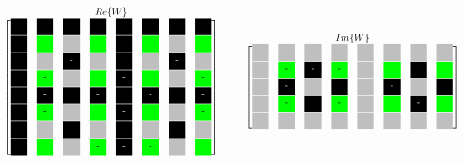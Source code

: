  \begin{minipage}{0.9\textwidth}
\begingroup
 \renewcommand*{\arraystretch}{0.95} %

\begin{center}
  \[
   \stackrel{\mbox{$Re\{W\}$}}{
    \begin{bmatrix}
     \myboxOnePos 	& \myboxOnePos 		& \myboxOnePos 	& \myboxOnePos 		& \myboxOnePos 	& \myboxOnePos 		& \myboxOnePos 	& \myboxOnePos \\
     \myboxOnePos 	& \myboxSqrtPos 	& \myboxZero 	& \myboxSqrtNeg		& \myboxOneNeg	& \myboxSqrtNeg		& \myboxZero	& \myboxSqrtPos \\
     \myboxOnePos 	& \myboxZero 		& \myboxOneNeg 	& \myboxZero 		& \myboxOnePos 	& \myboxZero 		& \myboxOneNeg 	& \myboxZero \\
     \myboxOnePos 	& \myboxSqrtNeg 	& \myboxZero 	& \myboxSqrtPos 	& \myboxOneNeg 	& \myboxSqrtPos 	& \myboxZero 	& \myboxSqrtNeg \\
     \myboxOnePos 	& \myboxOneNeg 		& \myboxOnePos 	& \myboxOneNeg 		& \myboxOnePos 	& \myboxOneNeg 		& \myboxOnePos 	& \myboxOneNeg \\
     \myboxOnePos 	& \myboxSqrtNeg 	& \myboxZero 	& \myboxSqrtPos 	& \myboxOneNeg 	& \myboxSqrtPos 	& \myboxZero 	& \myboxSqrtNeg \\
     \myboxOnePos 	& \myboxZero 		& \myboxOneNeg 	& \myboxZero 		& \myboxOnePos 	& \myboxZero 		& \myboxOneNeg 	& \myboxZero \\
     \myboxOnePos 	& \myboxSqrtPos 	& \myboxZero 	& \myboxSqrtNeg		& \myboxOneNeg	& \myboxSqrtNeg		& \myboxZero	& \myboxSqrtPos 
    \end{bmatrix}
   }
   \hspace{1cm}
   \stackrel{\mbox{$Im\{W\}$}}{
    \begin{bmatrix}
     \myboxZero 	& \myboxZero 		& \myboxZero 	& \myboxZero 		& \myboxZero 	& \myboxZero 		& \myboxZero 	& \myboxZero \\
     \myboxZero 	& \myboxSqrtNeg 	& \myboxOneNeg 	& \myboxSqrtNeg		& \myboxZero	& \myboxSqrtPos		& \myboxOnePos	& \myboxSqrtPos \\
     \myboxZero 	& \myboxOneNeg 		& \myboxZero 	& \myboxOnePos 		& \myboxZero 	& \myboxOneNeg 		& \myboxZero 	& \myboxOnePos \\
     \myboxZero 	& \myboxSqrtNeg 	& \myboxOnePos 	& \myboxSqrtNeg 	& \myboxZero 	& \myboxSqrtPos 	& \myboxOneNeg 	& \myboxSqrtPos \\
     \myboxZero 	& \myboxZero 		& \myboxZero 	& \myboxZero 		& \myboxZero 	& \myboxZero 		& \myboxZero 	& \myboxZero \\

\end{bmatrix}}\]
\end{center}
\end{minipage}
